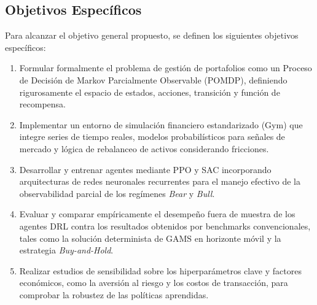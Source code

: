 \subsection{Objetivos Específicos}
Para alcanzar el objetivo general propuesto, se definen los siguientes objetivos específicos:
\begin{enumerate}
    \item Formular formalmente el problema de gestión de portafolios como un Proceso de Decisión de Markov Parcialmente Observable (POMDP), definiendo rigurosamente el espacio de estados, acciones, transición y función de recompensa.
    \item Implementar un entorno de simulación financiero estandarizado (Gym) que integre series de tiempo reales, modelos probabilísticos para señales de mercado y lógica de rebalanceo de activos considerando fricciones.
    \item Desarrollar y entrenar agentes mediante PPO y SAC incorporando arquitecturas de redes neuronales recurrentes para el manejo efectivo de la observabilidad parcial de los regímenes \textit{Bear} y \textit{Bull}.
    \item Evaluar y comparar empíricamente el desempeño fuera de muestra de los agentes DRL contra los resultados obtenidos por benchmarks convencionales, tales como la solución determinista de GAMS en horizonte móvil y la estrategia \textit{Buy-and-Hold}.
    \item Realizar estudios de sensibilidad sobre los hiperparámetros clave y factores económicos, como la aversión al riesgo y los costos de transacción, para comprobar la robustez de las políticas aprendidas.
\end{enumerate}
